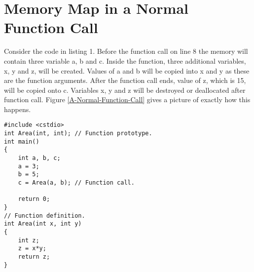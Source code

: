 \documentclass[12pt,a4paper]{article}
\begin{document}
\section{Memory Map in a Normal Function Call}
Consider the code in listing 1. Before the function call on line 8 the memory will contain three variable a, b and c. Inside the function, three additional variables, x, y and z, will be created. Values of a and b will be copied into x and y as these are the function arguments. After the function call ends, value of z, which is 15, will be copied onto c. Variables x, y and z will be destroyed or deallocated after function call. Figure \ref{A-Normal-Function-Call} gives a picture of exactly how this happens.
\begin{lstlisting}[caption={Calling a function}]
#include <cstdio>
int Area(int, int); // Function prototype.
int main()
{
	int a, b, c;
	a = 3;
	b = 5;
	c = Area(a, b); // Function call.
	
	return 0;
}
// Function definition.
int Area(int x, int y)
{
	int z;
	z = x*y;
	return z;
}
\end{lstlisting}
\end{document}
